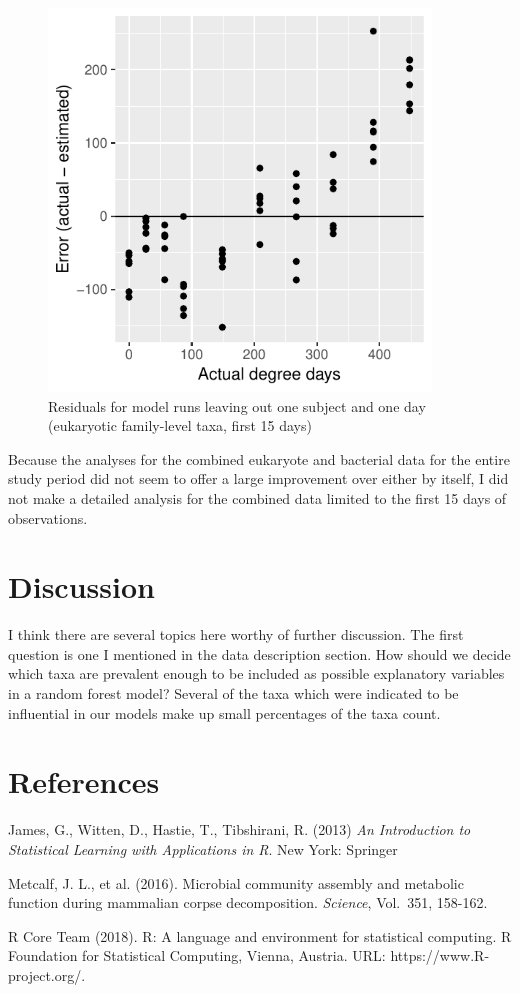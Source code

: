 \documentclass{article}
\begin{document}
\begin{figure}
  \centering
  \includegraphics[width=4in]{../eukaryote_data/only_families/first_two_weeks/hit_1perc_twice/leave_out_one_subj_and_one_day_residuals}
  \caption{Residuals for model runs leaving out one subject and one day (eukaryotic family-level taxa, first 15 days)}
  \label{fig:leave_one_out_resids_euk_family_taxa_first_15}
\end{figure}

Because the analyses for the combined eukaryote and bacterial data for
the entire study period did not seem to offer a large improvement over
either by itself, I did not make a detailed analysis for the combined
data limited to the first 15 days of observations.


\section{Discussion}

I think there are several topics here worthy of further discussion.
The first question is one I mentioned in the data description section.
How should we decide which taxa are prevalent enough to be included as
possible explanatory variables in a random forest model?  Several of
the taxa which were indicated to be influential in our models make up
small percentages of the taxa count.

\section{References}

\noindent James, G., Witten, D., Hastie, T., Tibshirani, R. (2013) \textit{An
  Introduction to Statistical Learning with Applications in R}. New
York: Springer

\noindent Metcalf, J. L., et al. (2016).  Microbial community assembly and
metabolic function during mammalian corpse decomposition.
\textit{Science}, Vol.~351, 158-162.

\noindent R Core Team (2018). R: A language and environment for
statistical computing. R Foundation for Statistical Computing, Vienna,
Austria. URL: https://www.R-project.org/.
\end{document}
